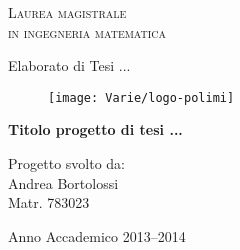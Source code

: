 \begin{titlepage}
\begin{center}
    { \scshape 
    Laurea magistrale\\
    in ingegneria matematica\\
    }
\end{center}
\vspace{1.2cm}
\begin{flushleft}
		\Large
		Elaborato di Tesi ...
		\vspace{1.5cm}
\end{flushleft}
\begin{figure}[h]
		\centering
		\texttt{[image: Varie/logo-polimi]}
		\vspace{1cm}
\end{figure}
\begin{center}
{ \bfseries  {\Large Titolo progetto di tesi ...}\\
\vspace{0.2cm} }
\end{center}
\vspace{0.4cm}
\begin{flushright}
		\Large
		Progetto svolto da:\\
		Andrea Bortolossi\\
		Matr. 783023\\
		\vspace{1.5cm}
\end{flushright}
\begin{center}
Anno Accademico 2013--2014
\end{center}

\end{titlepage}